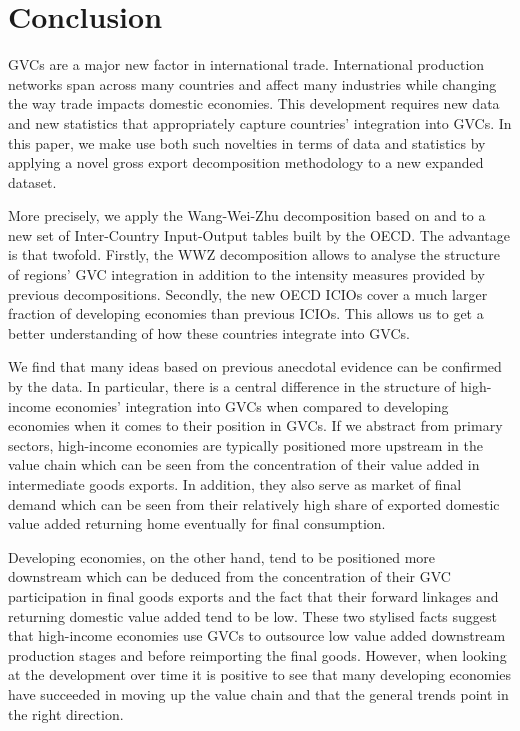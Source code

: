 \documentclass[11pt,a4paper]{article}
\begin{document}
\section{Conclusion}\label{sec:conclusion}
GVCs are a major new factor in international trade. International production networks span across many countries and affect many industries while changing the way trade impacts domestic economies. This development requires new data and new statistics that appropriately capture countries' integration into GVCs. In this paper, we make use both such novelties in terms of data and statistics by applying a novel gross export decomposition methodology to a new expanded dataset.

More precisely, we apply the Wang-Wei-Zhu decomposition based on \citet{zhwaetal13} and \citet{rokoetal14} to a new set of Inter-Country Input-Output tables built by the OECD. The advantage is that twofold. Firstly, the WWZ decomposition allows to analyse the structure of regions' GVC integration in addition to the intensity measures provided by previous decompositions. Secondly, the new OECD ICIOs cover a much larger fraction of developing economies than previous ICIOs. This allows us to get a better understanding of how these countries integrate into GVCs.

We find that many ideas based on previous anecdotal evidence can be confirmed by the data. In particular, there is a central difference in the structure of high-income economies' integration into GVCs when compared to developing economies when it comes to their position in GVCs. If we abstract from primary sectors, high-income economies are typically positioned more upstream in the value chain which can be seen from the concentration of their value added in intermediate goods exports. In addition, they also serve as market of final demand which can be seen from their relatively high share of exported domestic value added returning home eventually for final consumption.

Developing economies, on the other hand, tend to be positioned more downstream which can be deduced from the concentration of their GVC participation in final goods exports and the fact that their forward linkages and returning domestic value added tend to be low. These two stylised facts suggest that high-income economies use GVCs to outsource low value added downstream production stages and before reimporting the final goods. However, when looking at the development over time it is positive to see that many developing economies have succeeded in moving up the value chain and that the general trends point in the right direction.
\end{document}
